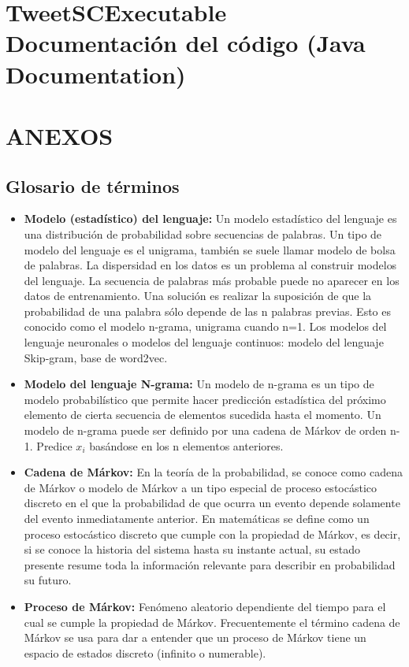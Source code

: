 \documentclass[spanish,12pt, a4paper,twoside]{paper}
\let\oldsection\section
\def\section{\cleardoublepage\oldsection}
\begin{document}
\section{TweetSCExecutable Documentación del código (Java Documentation)}\label{sec:tweetscexecutablejavadoc}


\section{ANEXOS}

\subsection{Glosario de términos}\label{sec:glosariodeterminos}
\begin{itemize}
	\item \textbf{Modelo (estadístico) del lenguaje:} Un modelo estadístico del lenguaje es una distribución de probabilidad sobre secuencias de palabras. Un tipo de modelo del lenguaje es el unigrama, también se suele llamar modelo de bolsa de palabras. La dispersidad en los datos es un problema al construir modelos del lenguaje. La secuencia de palabras más probable puede no aparecer en los datos de entrenamiento. Una solución es realizar la suposición de que la probabilidad de una palabra sólo depende de las n palabras previas. Esto es conocido como el modelo n-grama, unigrama cuando n=1. Los modelos del lenguaje neuronales o modelos del lenguaje continuos: modelo del lenguaje Skip-gram, base de word2vec.
	\item \textbf{Modelo del lenguaje N-grama:} Un modelo de n-grama es un tipo de modelo probabilístico que permite hacer predicción estadística del próximo elemento de cierta secuencia de elementos sucedida hasta el momento. Un modelo de n-grama puede ser definido por una cadena de Márkov de orden n-1. Predice $x_i$ basándose en los n elementos anteriores. 
	\item \textbf{Cadena de Márkov:} En la teoría de la probabilidad, se conoce como cadena de Márkov o modelo de Márkov a un tipo especial de proceso estocástico discreto en el que la probabilidad de que ocurra un evento depende solamente del evento inmediatamente anterior. En matemáticas se define como un proceso estocástico discreto que cumple con la propiedad de Márkov, es decir, si se conoce la historia del sistema hasta su instante actual, su estado presente resume toda la información relevante para describir en probabilidad su futuro.
	\item \textbf{Proceso de Márkov:} Fenómeno aleatorio dependiente del tiempo para el cual se cumple la propiedad de Márkov. Frecuentemente el término cadena de Márkov se usa para dar a entender que un proceso de Márkov tiene un espacio de estados discreto (infinito o numerable).

\end{itemize}
\end{document}
